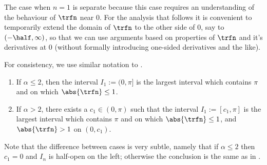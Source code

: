 The case when $n=1$ is separate because this case requires an understanding of the behaviour of $\trfn$ near 0. 
For the analysis that follows it is convenient to temporarily extend the domain of $\trfn$ to the other side of 0, say to $(-\half, \infty)$, so that we can use arguments based on properties of $\trfn$ and it's derivatives at 0 (without formally introducing one-sided derivatives and the like).
\begin{prop}[Spectral Band, $n=1$] \label{prp:SpecBandsn1}
	For consistency, we use similar notation to .
	\begin{enumerate}
		\item If $\alpha\leq2$, then the interval $I_{1}:=(0,\pi]$ is the largest interval which contains $\pi$ and on which $\abs{\trfn}\leq1$.
		\item If $\alpha>2$, there exists a $c_{1}\in(0,\pi)$ such that the interval $I_{1}:=[c_{1},\pi]$ is the largest interval which contains $\pi$ and on which $\abs{\trfn}\leq1$, and $\abs{\trfn}>1$ on $(0,c_{1})$.
	\end{enumerate}
\end{prop}
Note that the difference between cases is very subtle, namely that if $\alpha\leq2$ then $c_{1}=0$ and $I_{n}$ is half-open on the left; otherwise the conclusion is the same as in .
